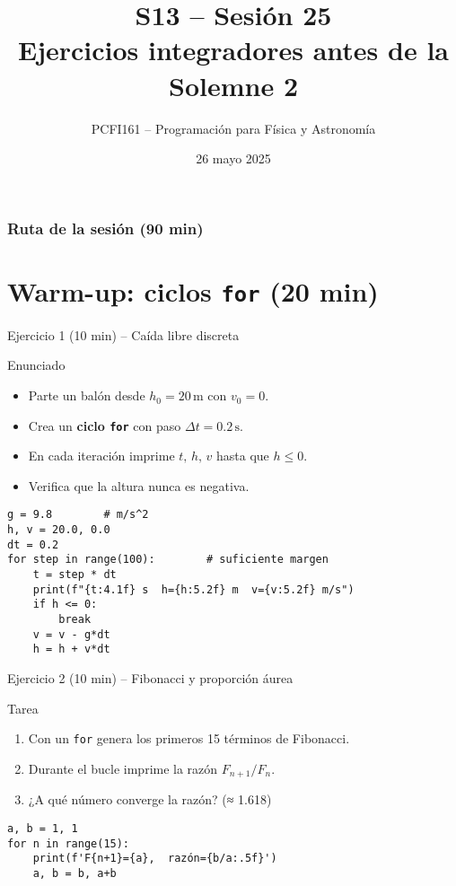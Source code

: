 \documentclass[10pt]{beamer}
\title{S13 -- Sesión 25\\Ejercicios integradores antes de la Solemne 2}
\author{PCFI161 -- Programación para Física y Astronomía}
\date{26 mayo 2025}
\begin{document}
\myfront{}

\begin{frame}
  \titlepage
\end{frame}

\begin{frame}
  \frametitle{Ruta de la sesión (90 min)}
  \tableofcontents
\end{frame}


\section{Warm-up: ciclos \texttt{for} (20 min)}

\begin{frame}[fragile]{Ejercicio 1 (10 min) – Caída libre discreta}
  \begin{block}{Enunciado}
    \begin{itemize}
      \item Parte un balón desde \(h_0=20\,\mathrm{m}\) con \(v_0=0\).
      \item Crea un \textbf{ciclo \texttt{for}} con paso \(\Delta t = 0.2\,\mathrm{s}\).
      \item En cada iteración imprime \(t,\,h,\,v\) hasta que \(h \le 0\).
      \item Verifica que la altura nunca es negativa.
    \end{itemize}
  \end{block}
  \begin{verbatim}
g = 9.8        # m/s^2
h, v = 20.0, 0.0
dt = 0.2
for step in range(100):        # suficiente margen
    t = step * dt
    print(f"{t:4.1f} s  h={h:5.2f} m  v={v:5.2f} m/s")
    if h <= 0:
        break
    v = v - g*dt
    h = h + v*dt
  \end{verbatim}
\end{frame}

\begin{frame}[fragile]{Ejercicio 2 (10 min) – Fibonacci y proporción áurea}
  \begin{block}{Tarea}
    \begin{enumerate}
      \item Con un \texttt{for} genera los primeros 15 términos de Fibonacci.
      \item Durante el bucle imprime la razón \(F_{n+1}/F_n\).
      \item ¿A qué número converge la razón? (≈ 1.618)
    \end{enumerate}
  \end{block}
  \begin{verbatim}
a, b = 1, 1
for n in range(15):
    print(f'F{n+1}={a},  razón={b/a:.5f}')
    a, b = b, a+b
  \end{verbatim}
\end{frame}
\end{document}
